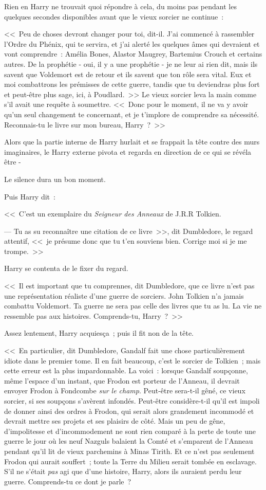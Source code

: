Rien en Harry ne trouvait quoi répondre à cela, du moins pas pendant les quelques secondes disponibles avant que le vieux sorcier ne continue~:

<<~Peu de choses devront changer pour toi, dit-il. J'ai commencé à rassembler l'Ordre du Phénix, qui te servira, et j'ai alerté les quelques âmes qui devraient et vont comprendre~: Amélia Bones, Alastor Maugrey, Bartemius Crouch et certains autres. De la prophétie - oui, il y a une prophétie - je ne leur ai rien dit, mais ils savent que Voldemort est de retour et ils savent que ton rôle sera vital. Eux et moi combattrons les prémisses de cette guerre, tandis que tu deviendras plus fort et peut-être plus sage, ici, à Poudlard.~>> Le vieux sorcier leva la main comme s'il avait une requête à soumettre. <<~Donc pour le moment, il ne va y avoir qu'un seul changement te concernant, et je t'implore de comprendre sa nécessité. Reconnais-tu le livre sur mon bureau, Harry~?~>>

Alors que la partie interne de Harry hurlait et se frappait la tête contre des murs imaginaires, le Harry externe pivota et regarda en direction de ce qui se révéla être -

Le silence dura un bon moment.

Puis Harry dit~:

<<~C'est un exemplaire du \emph{Seigneur des Anneaux} de J.R.R Tolkien.

--- Tu as su reconnaître une citation de ce livre~>>, dit Dumbledore, le regard attentif, <<~je présume donc que tu t'en souviens bien. Corrige moi si je me trompe.~>>

Harry se contenta de le fixer du regard.

<<~Il est important que tu comprennes, dit Dumbledore, que ce livre n'est pas une représentation réaliste d'une guerre de sorciers. John Tolkien n'a jamais combattu Voldemort. Ta guerre ne sera pas celle des livres que tu as lu. La vie ne ressemble pas aux histoires. Comprends-tu, Harry~?~>>

Assez lentement, Harry acquiesça~; puis il fit non de la tête.

<<~En particulier, dit Dumbledore, Gandalf fait une chose particulièrement idiote dans le premier tome. Il en fait beaucoup, c'est le sorcier de Tolkien~; mais cette erreur est la plus impardonnable. La voici~: lorsque Gandalf soupçonne, même l'espace d'un instant, que Frodon est porteur de l'Anneau, il devrait envoyer Frodon à Fondcombe \emph{sur le champ}. Peut-être sera-t-il gêné, ce vieux sorcier, si ses soupçons s'avèrent infondés. Peut-être considère-t-il qu'il est impoli de donner ainsi des ordres à Frodon, qui serait alors grandement incommodé et devrait mettre ses projets et ses plaisirs de côté. Mais un peu de gêne, d'impolitesse et d'incommodement ne sont rien comparé à la perte de toute une guerre le jour où les neuf Nazguls balaient la Comté et s'emparent de l'Anneau pendant qu'il lit de vieux parchemins à Minas Tirith. Et ce n'est pas seulement Frodon qui aurait souffert~; toute la Terre du Milieu serait tombée en esclavage. S'il ne s'était \emph{pas} agi que d'une histoire, Harry, alors ils auraient perdu leur guerre. Comprends-tu ce dont je parle~?

